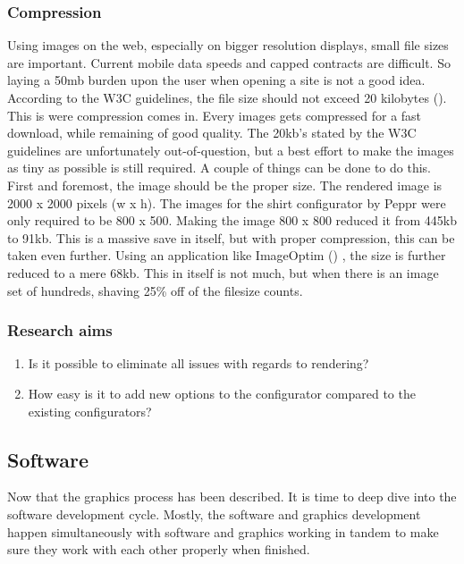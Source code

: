 \subsubsection{Compression}
Using images on the web, especially on bigger resolution displays, small file sizes are important. Current mobile data speeds and capped contracts are difficult. So laying a 50mb burden upon the user when opening a site is not a good idea. According to the W3C guidelines, the file size should not exceed 20 kilobytes (\cite{pageFileSizeLimit}). This is were compression comes in. Every images gets compressed for a fast download, while remaining of good quality. The 20kb's stated by the W3C guidelines are unfortunately out-of-question, but a best effort to make the images as tiny as possible is still required.
A couple of things can be done to do this. First and foremost, the image should be the proper size. The rendered image is 2000 x 2000 pixels (w x h). The images for the shirt configurator by Peppr were only required to be 800 x 500. Making the image 800 x 800 reduced it from 445kb to 91kb. This is a massive save in itself, but with proper compression, this can be taken even further. Using an application like ImageOptim (\cite{imageOptim}) , the size is further reduced to a mere 68kb. This in itself is not much, but when there is an image set of hundreds, shaving 25\% off of the filesize counts.


\subsubsection{Research aims}
\begin{enumerate}
	\item {Is it possible to eliminate all issues with regards to rendering?}
	\item {How easy is it to add new options to the configurator compared to the existing configurators?}
\end{enumerate}

\subsection{Software}
Now that the graphics process has been described. It is time to deep dive into the software development cycle. Mostly, the software and graphics development happen simultaneously with software and graphics working in tandem to make sure they work with each other properly when finished.
​
